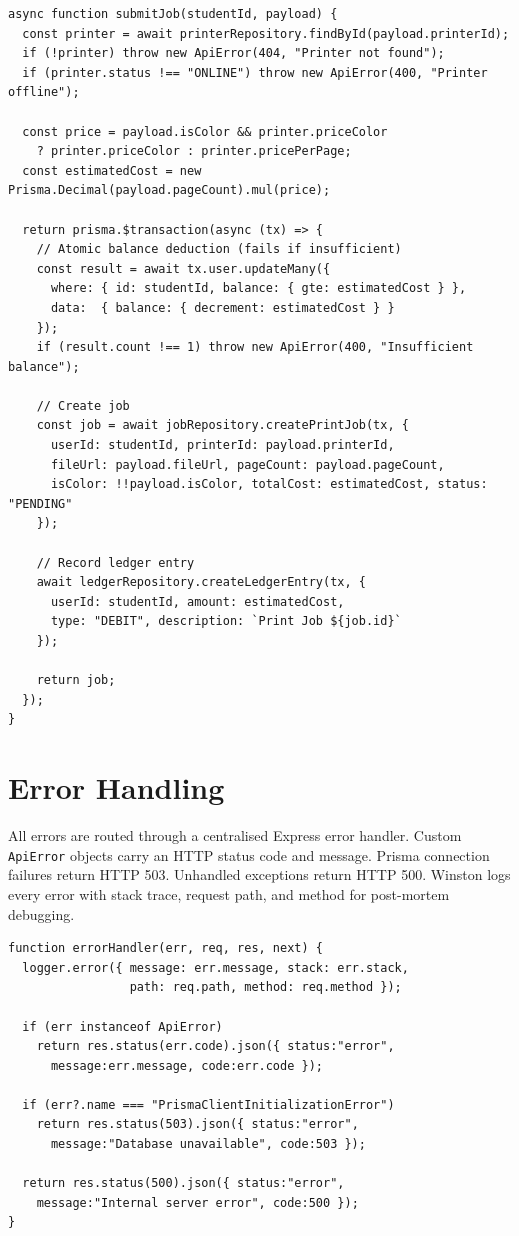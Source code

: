 \documentclass[12pt,a4paper]{report}
\begin{document}
\begin{lstlisting}[style=jsStyle, caption={Atomic print job transaction in job.service.js}]
async function submitJob(studentId, payload) {
  const printer = await printerRepository.findById(payload.printerId);
  if (!printer) throw new ApiError(404, "Printer not found");
  if (printer.status !== "ONLINE") throw new ApiError(400, "Printer offline");

  const price = payload.isColor && printer.priceColor
    ? printer.priceColor : printer.pricePerPage;
  const estimatedCost = new Prisma.Decimal(payload.pageCount).mul(price);

  return prisma.$transaction(async (tx) => {
    // Atomic balance deduction (fails if insufficient)
    const result = await tx.user.updateMany({
      where: { id: studentId, balance: { gte: estimatedCost } },
      data:  { balance: { decrement: estimatedCost } }
    });
    if (result.count !== 1) throw new ApiError(400, "Insufficient balance");

    // Create job
    const job = await jobRepository.createPrintJob(tx, {
      userId: studentId, printerId: payload.printerId,
      fileUrl: payload.fileUrl, pageCount: payload.pageCount,
      isColor: !!payload.isColor, totalCost: estimatedCost, status: "PENDING"
    });

    // Record ledger entry
    await ledgerRepository.createLedgerEntry(tx, {
      userId: studentId, amount: estimatedCost,
      type: "DEBIT", description: `Print Job ${job.id}`
    });

    return job;
  });
}
\end{lstlisting}

\section{Error Handling}

All errors are routed through a centralised Express error handler. Custom \texttt{ApiError}
objects carry an HTTP status code and message. Prisma connection failures return HTTP 503.
Unhandled exceptions return HTTP 500. Winston logs every error with stack trace, request
path, and method for post-mortem debugging.

\begin{lstlisting}[style=jsStyle, caption={Centralised error handler middleware}]
function errorHandler(err, req, res, next) {
  logger.error({ message: err.message, stack: err.stack,
                 path: req.path, method: req.method });

  if (err instanceof ApiError)
    return res.status(err.code).json({ status:"error",
      message:err.message, code:err.code });

  if (err?.name === "PrismaClientInitializationError")
    return res.status(503).json({ status:"error",
      message:"Database unavailable", code:503 });

  return res.status(500).json({ status:"error",
    message:"Internal server error", code:500 });
}
\end{lstlisting}
\end{document}
